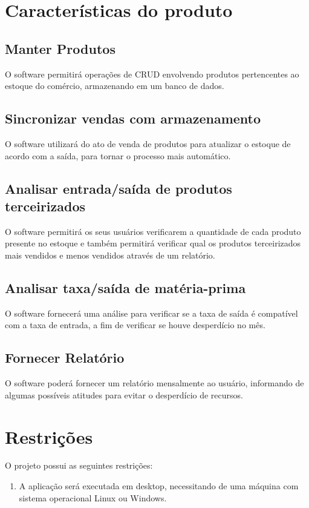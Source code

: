 \begin{appendices}
\begin{itemize}
	\end{itemize}


\section{Características do produto}

\subsection{Manter Produtos}
	O software permitirá operações de CRUD envolvendo produtos pertencentes ao estoque do comércio, armazenando em um banco de dados.

\subsection{Sincronizar vendas com armazenamento}
	O software utilizará do ato de venda de produtos para atualizar o estoque de acordo com a saída, para tornar o processo mais automático.

\subsection{Analisar entrada/saída de produtos terceirizados}
	O software permitirá os seus usuários verificarem a quantidade de cada produto presente no estoque e também permitirá verificar qual os produtos terceirizados mais vendidos e menos vendidos através de um relatório.

\subsection{Analisar taxa/saída de matéria-prima}
	O software fornecerá uma análise para verificar se a taxa de saída é compatível com a taxa de entrada, a fim de verificar se houve desperdício no mês.

\subsection{Fornecer Relatório}
	O software poderá fornecer um relatório mensalmente ao usuário, informando de algumas possíveis atitudes para evitar o desperdício de recursos.

\section{Restrições}
	O projeto possui as seguintes restrições:
	\begin{enumerate}
	\item A aplicação será executada em desktop, necessitando de uma máquina com sistema operacional Linux ou Windows.


\end{enumerate}
\end{appendices}
